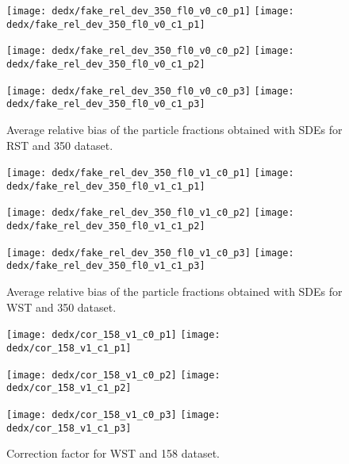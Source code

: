 \begin{figure}
  \centering
  \texttt{[image: dedx/fake\_rel\_dev\_350\_fl0\_v0\_c0\_p1]}
  \texttt{[image: dedx/fake\_rel\_dev\_350\_fl0\_v0\_c1\_p1]}

  \texttt{[image: dedx/fake\_rel\_dev\_350\_fl0\_v0\_c0\_p2]}
  \texttt{[image: dedx/fake\_rel\_dev\_350\_fl0\_v0\_c1\_p2]}

  \texttt{[image: dedx/fake\_rel\_dev\_350\_fl0\_v0\_c0\_p3]}
  \texttt{[image: dedx/fake\_rel\_dev\_350\_fl0\_v0\_c1\_p3]}


  \caption{Average relative bias of the particle fractions obtained with SDEs for RST and 350 \GeVc dataset.}
  \label{fig:hadron:dedx:fit:fake:reldev350r}
\end{figure}

\begin{figure}
  \centering
  \texttt{[image: dedx/fake\_rel\_dev\_350\_fl0\_v1\_c0\_p1]}
  \texttt{[image: dedx/fake\_rel\_dev\_350\_fl0\_v1\_c1\_p1]}

  \texttt{[image: dedx/fake\_rel\_dev\_350\_fl0\_v1\_c0\_p2]}
  \texttt{[image: dedx/fake\_rel\_dev\_350\_fl0\_v1\_c1\_p2]}

  \texttt{[image: dedx/fake\_rel\_dev\_350\_fl0\_v1\_c0\_p3]}
  \texttt{[image: dedx/fake\_rel\_dev\_350\_fl0\_v1\_c1\_p3]}

  \caption{Average relative bias of the particle fractions obtained with SDEs for WST and 350 \GeVc dataset.}
  \label{fig:hadron:dedx:fit:fake:reldev350w}
\end{figure}

\clearpage


\begin{figure}
  \centering
  \texttt{[image: dedx/cor\_158\_v1\_c0\_p1]}
  \texttt{[image: dedx/cor\_158\_v1\_c1\_p1]}

  \texttt{[image: dedx/cor\_158\_v1\_c0\_p2]}
  \texttt{[image: dedx/cor\_158\_v1\_c1\_p2]}

  \texttt{[image: dedx/cor\_158\_v1\_c0\_p3]}
  \texttt{[image: dedx/cor\_158\_v1\_c1\_p3]}

  \caption{Correction factor for WST and 158 \GeVc dataset.}
  \label{fig:hadron:dedx:fit:fake:cor158w}
\end{figure}



